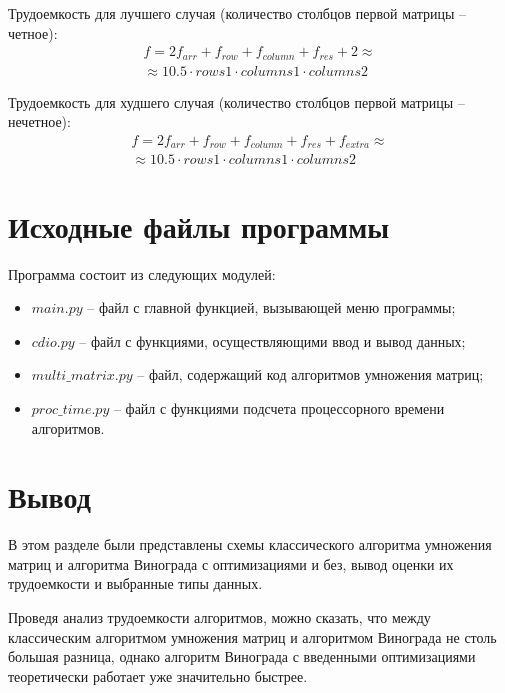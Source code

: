 \begin{itemize}
    Трудоемкость для лучшего случая (количество столбцов первой матрицы -- четное):
    \begin{equation}
    \begin{split}
        f = 2f_{arr} + f_{row} + f_{column} + f_{res} + 2 \approx \\
        \approx 10.5 \cdot rows1 \cdot columns1 \cdot columns2
    \end{split}
    \end{equation}
    
    Трудоемкость для худшего случая (количество столбцов первой матрицы -- нечетное):
    \begin{equation}
    \begin{split}
        f = 2f_{arr} + f_{row} + f_{column} + f_{res} + f_{extra} \approx \\
        \approx 10.5 \cdot rows1 \cdot columns1 \cdot columns2
    \end{split}
    \end{equation}
    
\end{itemize}

\clearpage

\section{Исходные файлы программы}
Программа состоит из следующих модулей:
\begin{itemize}
	\item $main.py$ -- файл с главной функцией, вызывающей меню программы;
	\item $cdio.py$ -- файл с функциями, осуществляющими ввод и вывод данных;
    \item $multi\_matrix.py$ -- файл, содержащий код алгоритмов умножения матриц;
    \item $proc\_time.py$ -- файл с функциями подсчета процессорного времени алгоритмов.
    \newline
\end{itemize}

\section*{Вывод}
В этом разделе были представлены схемы классического алгоритма умножения матриц и алгоритма Винограда с оптимизациями и без, вывод оценки их трудоемкости и выбранные типы данных.

Проведя анализ трудоемкости алгоритмов, можно сказать, что между классическим алгоритмом умножения матриц и алгоритмом Винограда не столь большая разница, однако алгоритм Винограда с введенными оптимизациями теоретически работает уже значительно быстрее.
